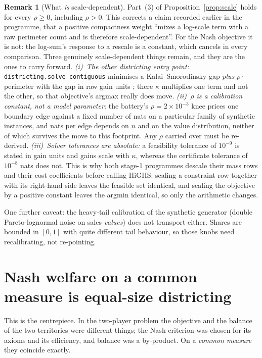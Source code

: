 \documentclass[11pt]{article}
\theoremstyle{definition}
\newtheorem{remark}{Remark}
\begin{document}
\begin{remark}[What \emph{is} scale-dependent]\label{rem:rho}
Part~(3) of Proposition~\ref{prop:scale} holds for every $\rho\ge0$, including $\rho>0$.
This corrects a claim recorded earlier in the programme, that a positive compactness
weight ``mixes a log-scale term with a raw perimeter count and is therefore
scale-dependent''. For the Nash objective it is not: the log-sum's response to a rescale is
a constant, which cancels in every comparison. Three genuinely scale-dependent things
remain, and they are the ones to carry forward. \emph{(i)~The other districting entry
point:} \texttt{districting.solve\_contiguous} minimises a Kalai--Smorodinsky gap
\emph{plus} $\rho\cdot$perimeter with the gap in raw gain units \citep{kalai1975}; there
$\kappa$ multiplies one term and not the other, so that objective's argmax really does move.
\emph{(ii)~$\rho$ is a calibration constant, not a model parameter:} the battery's
$\rho=2\times10^{-3}$ knee prices one boundary edge against a fixed number of nats on a
particular family of synthetic instances, and nats per edge depends on $n$ and on the value
distribution, neither of which survives the move to this footprint. Any $\rho$ carried over
must be re-derived. \emph{(iii)~Solver tolerances are absolute:} a feasibility tolerance of
$10^{-9}$ is stated in gain units and gains scale with $\kappa$, whereas the certificate
tolerance of $10^{-8}$ nats does not. This is why both stage-1 programmes descale their mass
rows and their cost coefficients before calling HiGHS: scaling a constraint row together
with its right-hand side leaves the feasible set identical, and scaling the objective by a
positive constant leaves the argmin identical, so only the arithmetic changes.
\end{remark}

One further caveat: the heavy-tail calibration of the synthetic generator (double
Pareto-lognormal noise on sales \emph{values}) does not transport either. Shares are
bounded in $[0,1]$ with quite different tail behaviour, so those knobs need recalibrating,
not re-pointing.

\section{Nash welfare on a common measure is equal-size districting}\label{sec:equalsize}

This is the centrepiece. In the two-player problem the objective and the balance of the
two territories were different things; the Nash criterion was chosen for its axioms and
its efficiency, and balance was a by-product. On a \emph{common measure} they coincide
exactly.
\end{document}
